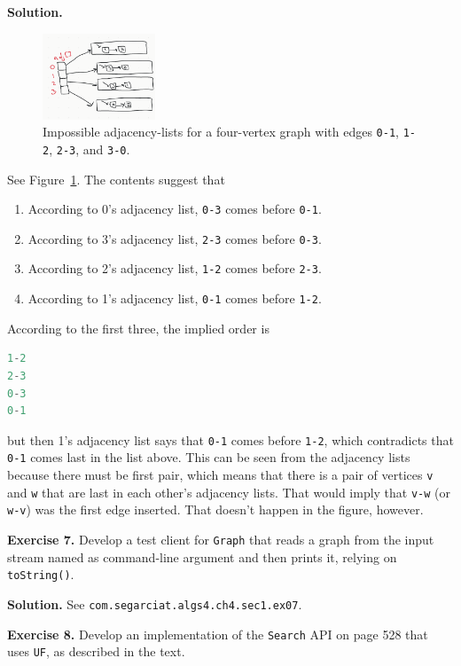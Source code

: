 \documentclass[12pt, a4paper]{article}
\newenvironment{ex}[2][Exercise]
{\par\medskip\noindent \textbf{#1 #2.}}
{\medskip}
\newenvironment{sol}[1][Solution]
{\par\medskip\noindent \textbf{#1.} }
{\medskip}
\begin{document}
	\begin{sol}
		\begin{figure}
			\centering
			\includegraphics[width=0.3\textwidth]{exercise-06}
			\caption{Impossible adjacency-lists for a four-vertex graph with edges
			\texttt{0-1}, \texttt{1-2}, \texttt{2-3}, and \texttt{3-0}.}
			\label{fig:ex-06}
		\end{figure}
		See Figure~\ref{fig:ex-06}. The contents suggest that
		\begin{enumerate}
			\item According to 0's adjacency list, \texttt{0-3} comes before \texttt{0-1}.
			\item According to 3's adjacency list, \texttt{2-3} comes before \texttt{0-3}.
			\item According to 2's adjacency list, \texttt{1-2} comes before \texttt{2-3}.
			\item According to 1's adjacency list, \texttt{0-1} comes before \texttt{1-2}.
		\end{enumerate}
		According to the first three, the implied order is
		\begin{lstlisting}[language=java]
1-2
2-3
0-3
0-1
		\end{lstlisting}
		but then 1's adjacency list says that \texttt{0-1} comes before \texttt{1-2},
		which contradicts that \texttt{0-1} comes last in the list above. This can
		be seen from the adjacency lists because there must be first pair, which means
		that there is a pair of vertices \texttt{v} and \texttt{w} that are last in each
		other's adjacency lists. That would imply that \texttt{v-w} (or \texttt{w-v})
		was the first edge inserted. That doesn't happen in the figure, however.
	\end{sol}
	\begin{ex}{7}
		Develop a test client for \texttt{Graph} that reads a graph from the input stream
		named as command-line argument and then prints it, relying on \texttt{toString()}.
	\end{ex}
	\begin{sol}
		See \texttt{com.segarciat.algs4.ch4.sec1.ex07}.
	\end{sol}
	\begin{ex}{8}
		Develop an implementation of the \texttt{Search} API on page 528 that uses \texttt{UF},
		as described in the text.
	\end{ex}
\end{document}

